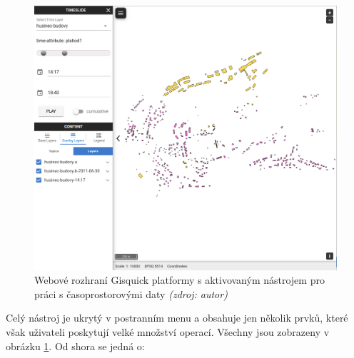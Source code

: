 \begin{figure}[h!]
\centering
\includegraphics[width=1\textwidth]{./img/gisquick-time-tool.png}
\caption{Webové rozhraní Gisquick platformy s aktivovaným nástrojem
pro práci s časoprostorovými daty \textit{(zdroj: autor)}}
\label{fig:gisquick-client}
\end{figure}

Celý nástroj je ukrytý v postranním menu a obsahuje jen několik prvků,
které však uživateli poskytují velké množství operací. Všechny
jsou zobrazeny v obrázku \ref{fig:gisquick-client}. Od shora se
jedná o:

